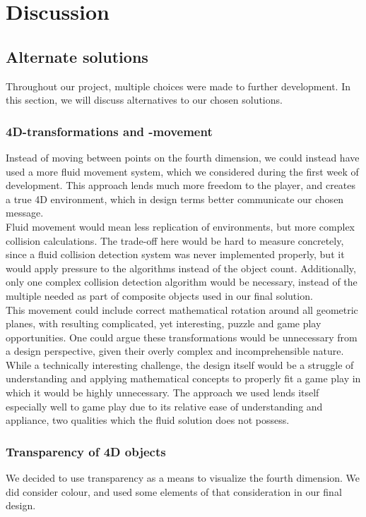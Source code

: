 \section{Discussion}
\subsection{Alternate solutions}
Throughout our project, multiple choices were made to further development. In this section, we will discuss alternatives to our chosen solutions.

\subsubsection{4D-transformations and -movement}
Instead of moving between points on the fourth dimension, we could instead have used a more fluid movement system, which we considered during the first week of development. This approach lends much more freedom to the player, and creates a true 4D environment, which in design terms better communicate our chosen message.\\

Fluid movement would mean less replication of environments, but more complex collision calculations. The trade-off here would be hard to measure concretely, since a fluid collision detection system was never implemented properly, but it would apply pressure to the algorithms instead of the object count. Additionally, only one complex collision detection algorithm would be necessary, instead of the multiple needed as part of composite objects used in our final solution.\\

This movement could include correct mathematical rotation around all geometric planes, with resulting complicated, yet interesting, puzzle and game play opportunities. One could argue these transformations would be unnecessary from a design perspective, given their overly complex and incomprehensible nature.\\

While a technically interesting challenge, the design itself would be a struggle of understanding and applying mathematical concepts to properly fit a game play in which it would be highly unnecessary. The approach we used lends itself especially well to game play due to its relative ease of understanding and appliance, two qualities which the fluid solution does not possess.

\subsubsection{Transparency of 4D objects}
We decided to use transparency as a means to visualize the fourth dimension. We did consider colour, and used some elements of that consideration in our final design.\\

